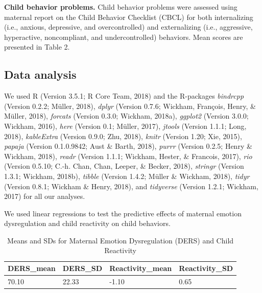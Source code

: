 \documentclass[man]{apa6}
\begin{document}
\textbf{Child behavior problems.} Child behavior problems were assessed
using maternal report on the Child Behavior Checklist (CBCL) for both
internalizing (i.e., anxious, depressive, and overcontrolled) and
externalizing (i.e., aggressive, hyperactive, noncompliant, and
undercontrolled) behaviors. Mean scores are presented in Table 2.

\subsection{Data analysis}\label{data-analysis}

We used R (Version 3.5.1; R Core Team, 2018) and the R-packages
\emph{bindrcpp} (Version 0.2.2; Müller, 2018), \emph{dplyr} (Version
0.7.6; Wickham, François, Henry, \& Müller, 2018), \emph{forcats}
(Version 0.3.0; Wickham, 2018a), \emph{ggplot2} (Version 3.0.0; Wickham,
2016), \emph{here} (Version 0.1; Müller, 2017), \emph{jtools} (Version
1.1.1; Long, 2018), \emph{kableExtra} (Version 0.9.0; Zhu, 2018),
\emph{knitr} (Version 1.20; Xie, 2015), \emph{papaja} (Version
0.1.0.9842; Aust \& Barth, 2018), \emph{purrr} (Version 0.2.5; Henry \&
Wickham, 2018), \emph{readr} (Version 1.1.1; Wickham, Hester, \&
Francois, 2017), \emph{rio} (Version 0.5.10; C.-h. Chan, Chan, Leeper,
\& Becker, 2018), \emph{stringr} (Version 1.3.1; Wickham, 2018b),
\emph{tibble} (Version 1.4.2; Müller \& Wickham, 2018), \emph{tidyr}
(Version 0.8.1; Wickham \& Henry, 2018), and \emph{tidyverse} (Version
1.2.1; Wickham, 2017) for all our analyses.

We used linear regressions to test the predictive effects of maternal
emotion dysregulation and child reactivity on child behaviors.

\begin{table}[tbp]
\begin{center}
\begin{threeparttable}
\caption{\label{tab:descriptives ders and reactivity}Means and SDs for Maternal Emotion Dysregulation (DERS) and Child Reactivity}
\begin{tabular}{llll}
\toprule
DERS\_mean & \multicolumn{1}{c}{DERS\_SD} & \multicolumn{1}{c}{Reactivity\_mean} & \multicolumn{1}{c}{Reactivity\_SD}\\
\midrule
70.10 & 22.33 & -1.10 & 0.65\\
\bottomrule
\end{tabular}
\end{threeparttable}
\end{center}
\end{table}
\end{document}
